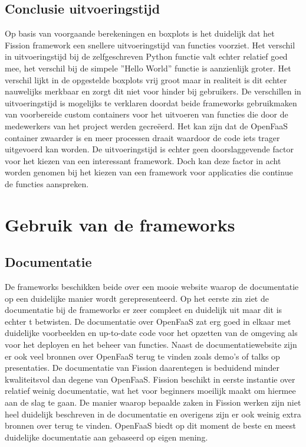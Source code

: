 \subsection{Conclusie uitvoeringstijd}
Op basis van voorgaande berekeningen en boxplots is het duidelijk dat het Fission framework een snellere uitvoeringstijd van functies voorziet. Het verschil in uitvoeringstijd bij de zelfgeschreven Python functie valt echter relatief goed mee, het verschil bij de simpele ''Hello World'' functie is aanzienlijk groter. Het verschil lijkt in de opgestelde boxplots vrij groot maar in realiteit is dit echter nauwelijks merkbaar en zorgt dit niet voor hinder bij gebruikers. De verschillen in uitvoeringstijd is mogelijks te verklaren doordat beide frameworks gebruikmaken van voorbereide custom containers voor het uitvoeren van functies die door de medewerkers van het project werden gecreëerd. Het kan zijn dat de OpenFaaS container zwaarder is en meer processen draait waardoor de code iets trager uitgevoerd kan worden. De uitvoeringstijd is echter geen doorslaggevende factor voor het kiezen van een interessant framework. Doch kan deze factor in acht worden genomen bij het kiezen van een framework voor applicaties die continue de functies aanspreken.

\section{Gebruik van de frameworks}
\subsection{Documentatie}
De frameworks beschikken beide over een mooie website waarop de documentatie op een duidelijke manier wordt gerepresenteerd. Op het eerste zin ziet de documentatie bij de frameworks er zeer compleet en duidelijk uit maar dit is echter t betwisten. De documentatie over OpenFaaS zat erg goed in elkaar met duidelijke voorbeelden en up-to-date code voor het opzetten van de omgeving als voor het deployen en het beheer van functies. Naast de documentatiewebsite zijn er ook veel bronnen over OpenFaaS terug te vinden zoals demo's of talks op presentaties. De documentatie van Fission daarentegen is beduidend minder kwaliteitsvol dan degene van OpenFaaS. Fission beschikt in eerste instantie over relatief weinig documentatie, wat het voor beginners moeilijk maakt om hiermee aan de slag te gaan. De manier waarop bepaalde zaken in Fission werken zijn niet heel duidelijk beschreven in de documentatie en overigens zijn er ook weinig extra bronnen over terug te vinden. OpenFaaS biedt op dit moment de beste en meest duidelijke documentatie aan gebaseerd op eigen mening.

